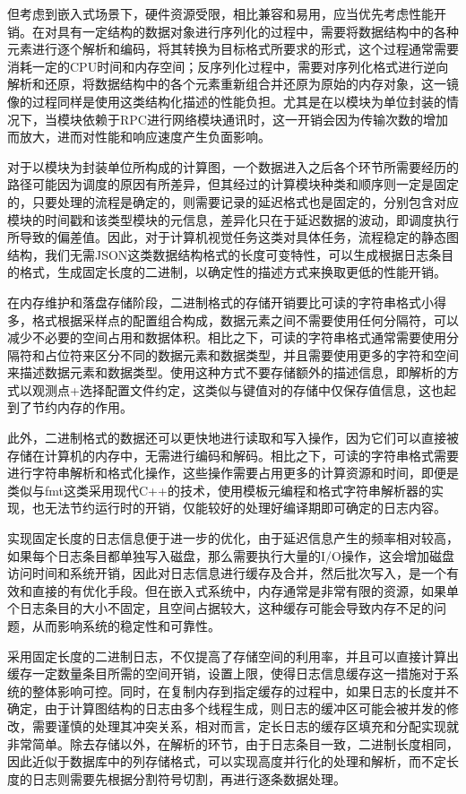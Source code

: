 \documentclass[master]{shtthesis}
\begin{document}
但考虑到嵌入式场景下，硬件资源受限，相比兼容和易用，应当优先考虑性能开销。在对具有一定结构的数据对象进行序列化的过程中，需要将数据结构中的各种元素进行逐个解析和编码，将其转换为目标格式所要求的形式，这个过程通常需要消耗一定的CPU时间和内存空间；反序列化过程中，需要对序列化格式进行逆向解析和还原，将数据结构中的各个元素重新组合并还原为原始的内存对象，这一镜像的过程同样是使用这类结构化描述的性能负担。尤其是在以模块为单位封装的情况下，当模块依赖于RPC进行网络模块通讯时，这一开销会因为传输次数的增加而放大，进而对性能和响应速度产生负面影响。

对于以模块为封装单位所构成的计算图，一个数据进入之后各个环节所需要经历的路径可能因为调度的原因有所差异，但其经过的计算模块种类和顺序则一定是固定的，只要处理的流程是确定的，则需要记录的延迟格式也是固定的，分别包含对应模块的时间戳和该类型模块的元信息，差异化只在于延迟数据的波动，即调度执行所导致的偏差值。因此，对于计算机视觉任务这类对具体任务，流程稳定的静态图结构，我们无需JSON这类数据结构格式的长度可变特性，可以生成根据日志条目的格式，生成固定长度的二进制，以确定性的描述方式来换取更低的性能开销。

在内存维护和落盘存储阶段，二进制格式的存储开销要比可读的字符串格式小得多，格式根据采样点的配置组合构成，数据元素之间不需要使用任何分隔符，可以减少不必要的空间占用和数据体积。相比之下，可读的字符串格式通常需要使用分隔符和占位符来区分不同的数据元素和数据类型，并且需要使用更多的字符和空间来描述数据元素和数据类型。使用这种方式不要存储额外的描述信息，即解析的方式以观测点+选择配置文件约定，这类似与键值对的存储中仅保存值信息，这也起到了节约内存的作用。

此外，二进制格式的数据还可以更快地进行读取和写入操作，因为它们可以直接被存储在计算机的内存中，无需进行编码和解码。相比之下，可读的字符串格式需要进行字符串解析和格式化操作，这些操作需要占用更多的计算资源和时间，即便是类似与fmt这类采用现代C++的技术，使用模板元编程和格式字符串解析器的实现，也无法节约运行时的开销，仅能较好的处理好编译期即可确定的日志内容。

实现固定长度的日志信息便于进一步的优化，由于延迟信息产生的频率相对较高，如果每个日志条目都单独写入磁盘，那么需要执行大量的I/O操作，这会增加磁盘访问时间和系统开销，因此对日志信息进行缓存及合并，然后批次写入，是一个有效和直接的有优化手段。但在嵌入式系统中，内存通常是非常有限的资源，如果单个日志条目的大小不固定，且空间占据较大，这种缓存可能会导致内存不足的问题，从而影响系统的稳定性和可靠性。

采用固定长度的二进制日志，不仅提高了存储空间的利用率，并且可以直接计算出缓存一定数量条目所需的空间开销，设置上限，使得日志信息缓存这一措施对于系统的整体影响可控。同时，在复制内存到指定缓存的过程中，如果日志的长度并不确定，由于计算图结构的日志由多个线程生成，则日志的缓冲区可能会被并发的修改，需要谨慎的处理其冲突关系，相对而言，定长日志的缓存区填充和分配实现就非常简单。除去存储以外，在解析的环节，由于日志条目一致，二进制长度相同，因此近似于数据库中的列存储格式，可以实现高度并行化的处理和解析，而不定长度的日志则需要先根据分割符号切割，再进行逐条数据处理。
\end{document}
